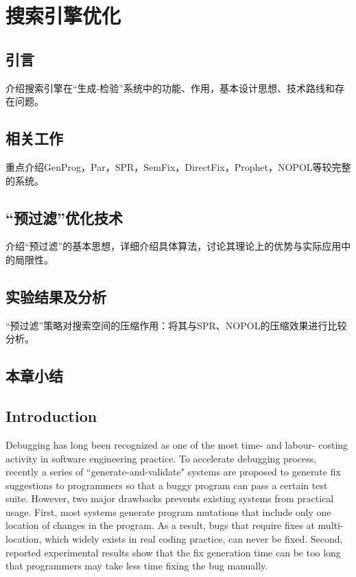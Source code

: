 \chapter{搜索引擎优化}
\label{cha:filter}
\newcommand{\SmartDebug}{
	\textbf{\textit{SmartDebug}}
}

\section{引言}%
介绍搜索引擎在“生成-检验”系统中的功能、作用，基本设计思想、技术路线和存在问题。
\section{相关工作}%
重点介绍GenProg，Par，SPR，SemFix，DirectFix，Prophet，NOPOL等较完整的系统。
\section{“预过滤”优化技术}%
介绍“预过滤”的基本思想，详细介绍具体算法，讨论其理论上的优势与实际应用中的局限性。
\section{实验结果及分析}%
“预过滤”策略对搜索空间的压缩作用：将其与SPR、NOPOL的压缩效果进行比较分析。
\section{本章小结}%

\section{Introduction}
Debugging has long been recognized as one of the most time- and labour- costing activity in software engineering practice. To accelerate debugging process, recently a series of ``generate-and-validate" systems are proposed to generate fix suggestions to programmers so that a buggy program can pass a certain test suite.
However, two major drawbacks prevents existing systems from practical usage. First, most systems generate program mutations that include only one location of changes in the program. As a result, bugs that require fixes at multi-location, which widely exists in real coding practice, can never be fixed. Second, reported experimental results show that the fix generation time can be too long that programmers may take less time fixing the bug manually.

